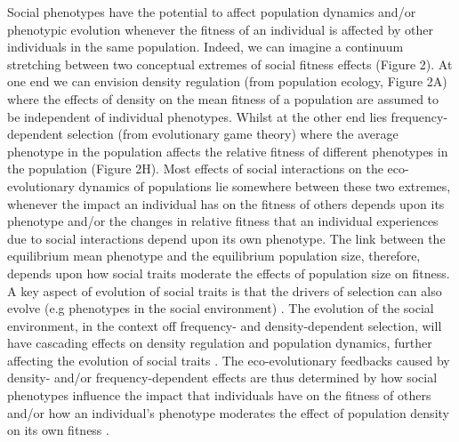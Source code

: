 \documentclass{article}
\begin{document}
Social phenotypes have the potential to affect population dynamics and/or phenotypic evolution whenever the fitness of an individual is affected by other individuals in the same population. Indeed, we can imagine a continuum stretching between two conceptual extremes of social fitness effects (Figure 2). At one end we can envision density regulation (from population ecology, Figure 2A) where the effects of density on the mean fitness of a population are assumed to be independent of individual phenotypes. Whilst at the other end lies frequency-dependent selection (from evolutionary game theory) where the average phenotype in the population affects the relative fitness of different phenotypes in the population (Figure 2H). Most effects of social interactions on the eco-evolutionary dynamics of populations lie somewhere between these two extremes, whenever the impact an individual has on the fitness of others depends upon its phenotype and/or the changes in relative fitness that an individual experiences due to social interactions depend upon its own phenotype. The link between the equilibrium mean phenotype and the equilibrium population size, therefore, depends upon how social traits moderate the effects of population size on fitness. A key aspect of evolution of social traits is that the drivers of selection can also evolve (e.g phenotypes in the social environment) \citep{West-Eberhard1979, Moore1997}. The evolution of the social environment, in the context off frequency- and density-dependent selection, will have cascading effects on density regulation and population dynamics, further affecting the evolution of social traits \citep{Heino1998}. The eco-evolutionary feedbacks caused by density- and/or frequency-dependent effects are thus determined by how social phenotypes influence the impact that individuals have on the fitness of others and/or how an individual's phenotype moderates the effect of population density on its own fitness \citep{Engen2020}. 
\end{document}
